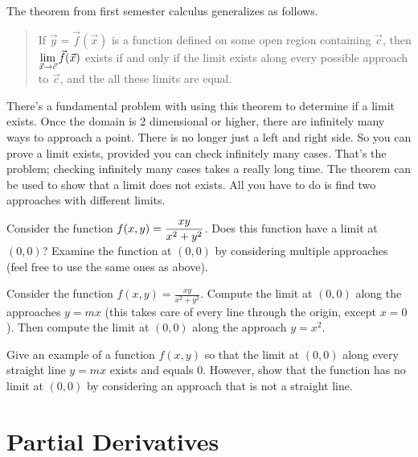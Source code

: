 The theorem from first semester calculus generalizes as follows.
\begin{quote}
 If $\vec y=\vec f(\vec x)$ is a function defined on some open region containing $\vec c$, then $\displaystyle\lim_{\vec x\to \vec c}\vec f(\vec x)$ exists if and only if the limit exists along every possible approach to $\vec c$, and the all these limits are equal.
\end{quote}
There's a fundamental problem with using this theorem to determine if a limit exists. Once the domain is 2 dimensional or higher, there are infinitely many ways to approach a point. There is no longer just a left and right side. So you can prove a limit exists, provided you can check infinitely many cases. That's the problem; checking infinitely many cases takes a really long time.  The theorem can be used to show that a limit does not exists.  All you have to do is find two approaches with different limits.

\begin{problem}%
 Consider the function $\displaystyle f(x,y) = \frac{xy}{x^2+y^2}$.  Does this function have a limit at $(0,0)$?  Examine the function at $(0,0)$ by considering multiple approaches (feel free to use the same ones as above). 
\end{problem}

\begin{problem}
 Consider the function $f(x,y) = \frac{xy}{x^2+y^2}$.  Compute the limit at $(0,0)$ along the approaches $y=mx$ (this takes care of every line through the origin, except $x=0$).  Then compute the limit at $(0,0)$ along the approach $y=x^2$.
\end{problem}

\begin{problem}[Challenge]
 Give an example of a function $f(x,y)$ so that the limit at $(0,0)$ along every straight line $y=mx$ exists and equals 0.  However, show that the function has no limit at $(0,0)$ by considering an approach that is not a straight line.
\end{problem}


\section{Partial Derivatives}

